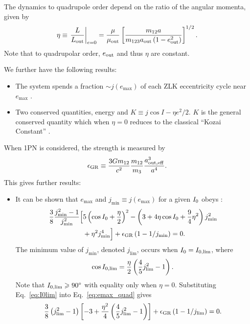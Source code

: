 \documentclass[
        fleqn,
        usenatbib,
    ]{mnras}
\newcommand*{\at}[1]{\left.#1\right|}
\newcommand*{\p}[1]{\left(#1\right)}
\newcommand*{\s}[1]{\left[#1\right]}
\begin{document}
The dynamics to quadrupole order depend on the ratio of the angular momenta,
given by
\begin{equation}
    \eta \equiv \at{\frac{L}{L_{\rm out}}}_{e = 0}
        = \frac{\mu}{\mu_{\rm out}}\s{\frac{m_{12}a}
            {m_{123}a_{\rm out}\p{1 - e_{\rm out}^2}}}^{1/2}.\label{eq:def_eta}
\end{equation}
Note that to quadrupolar order, $e_{\rm out}$ and thus $\eta$ are constant.

We further have the following results:
\begin{itemize}
    \item The system spends a fraction $\sim j(e_{\max})$ of each ZLK
        eccentricity cycle near $e_{\max}$ \citep{anderson2016formation}.

    \item Two conserved quantities, energy and $K \equiv j \cos I - \eta e^2 /
        2$. $K$ is the general conserved quantity which when $\eta = 0$ reduces
        to the classical ``Kozai Constant'' \citep{LML15}.
\end{itemize}

When 1PN is considered, the strength is measured by
\begin{equation}
    \epsilon_{\rm GR} \equiv \frac{3Gm_{12}}{c^2}
        \frac{m_{12}}{m_3}\frac{a_{\rm out, eff}^3}{a^4}.
\end{equation}
This gives further results:
\begin{itemize}
    \item It can be shown that $e_{\max}$ and $j_{\min} \equiv j(e_{\max})$ for
        a given $I_{\rm 0}$ obeys \citep{LML15, anderson2016formation}:
        \begin{align}
            \frac{3}{8}\frac{j_{\min}^2 - 1}{j_{\min}^2}\Big[&
                5\p{\cos I_0 + \frac{\eta}{2}}^2
                - \p{3 + 4\eta \cos I_0 + \frac{9}{4}\eta^2}j_{\min}^2
                    \nonumber\\
                &+ \eta^2 j_{\min}^4
            \Big] + \epsilon_{\rm GR}\p{1 - 1 / j_{\min}} = 0.\label{eq:emax_quad}
        \end{align}
        The minimum value of $j_{\min}$, denoted $j_{\lim}$, occurs when $I_0
        = I_{\rm 0, \lim}$, where
        \begin{equation}
            \cos I_{\rm 0, \lim} = \frac{\eta}{2}\p{\frac{4}{5}j_{\lim}^2 -
                1}.\label{eq:I0lim}
        \end{equation}
        Note that $I_{\rm 0, \lim} \geq 90^\circ$ with equality only when $\eta
        = 0$. Substituting Eq.~\eqref{eq:I0lim} into Eq.~\eqref{eq:emax_quad}
        gives
        \begin{equation}
            \frac{3}{8}\p{j_{\lim}^2 - 1}\s{-3 + \frac{\eta^2}{4}
                \p{\frac{4}{5}j_{\lim}^2 - 1}}
                + \epsilon_{\rm GR}\p{1 - 1 / j_{\lim}} = 0.
                \label{eq:def_elim}
        \end{equation}
\end{itemize}
\end{document}
